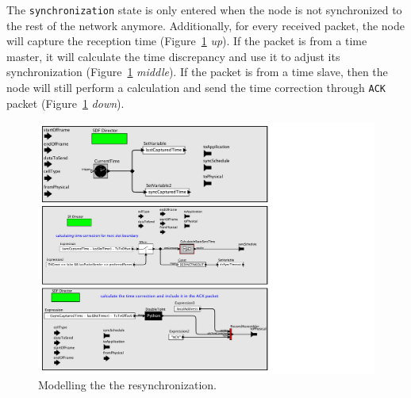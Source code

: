 The \texttt{synchronization} state is only entered when the node is not synchronized to the rest of the network anymore. Additionally, for every received packet, the node will capture the reception time (Figure~\ref{fig:timeCorrection} {\em up}). If the packet is from a time master, it will calculate the time discrepancy and use it to adjust its synchronization (Figure~\ref{fig:timeCorrection} {\em middle}). If the packet is from a time slave, then the node will still perform a calculation and send the time correction through \texttt{ACK} packet (Figure~\ref{fig:timeCorrection} {\em down}).

\begin{figure}[t]
\centering
\includegraphics[width=0.9\columnwidth]{figures/PaperReSynchronization}
\caption{Modelling the the resynchronization.}
\label{fig:timeCorrection}
\end{figure}



